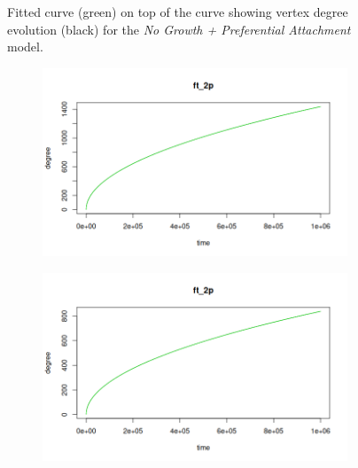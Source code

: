 \begin{figure}[ht]
\begin{subfigure}{.5\textwidth}
\end{subfigure}
\caption{Fitted curve (green) on top of the curve showing vertex degree evolution (black) for the \textit{No Growth + Preferential Attachment} model.}
\label{fig:fit_NG}
\end{figure}

\begin{figure}[ht]
\centering
\begin{subfigure}{.5\textwidth}
  \centering
  \includegraphics[width=\linewidth]{figures/scaling_fits/fit_ba_0.png}
\end{subfigure}%
\begin{subfigure}{.5\textwidth}
  \centering
  \includegraphics[width=\linewidth]{figures/scaling_fits/fit_ba_1.png}
\end{subfigure}
\begin{subfigure}{.5\textwidth}
  \centering

\end{subfigure}
\end{figure}
